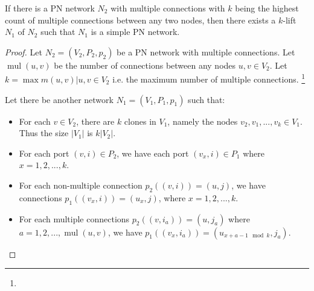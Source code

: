 \begin{theorem} \label{thm:lcl_nonsolvability:3}
    If there is a PN network $N_2$ with multiple connections with $k$ being the highest count of multiple connections between any two nodes, then there exists a $k$-lift $N_1$ of $N_2$ such that $N_1$ is a simple PN network.
\end{theorem}
\begin{proof}
    Let $N_2=(V_2, P_2, p_2)$ be a PN network with multiple connections.
    Let $\operatorname{mul}(u, v)$ be the number of connections between any nodes $u, v \in V_2$.
    Let $k=\max {m(u, v) | u, v \in V_2}$ i.e. the maximum number of multiple connections.
    \footnote{}

    Let there be another network $N_1=(V_1, P_1, p_1)$ such that:
    \begin{itemize}
        \item For each $v \in V_2$, there are $k$ clones in $V_1$, namely the nodes $v_2, v_1, ..., v_k \in V_1$.
            Thus the size $|V_1|$ is $k|V_2|$.
        \item For each port $(v, i) \in P_2$, we have each port $(v_x, i) \in P_1$ where $x=1, 2, ..., k$.
        \item For each non-multiple connection $p_2((v, i)) = (u, j)$, we have connections $p_1((v_x, i)) = (u_x, j)$, where $x=1, 2, ..., k$.
        \item For each multiple connections $p_2((v, i_a)) = (u, j_a)$ where $a = 1, 2, ..., \operatorname{mul}(u, v)$, we have $p_1((v_{x}, i_a)) = (u_{x+a-1 \mod k}, j_a)$.
    \end{itemize}


\end{proof}
